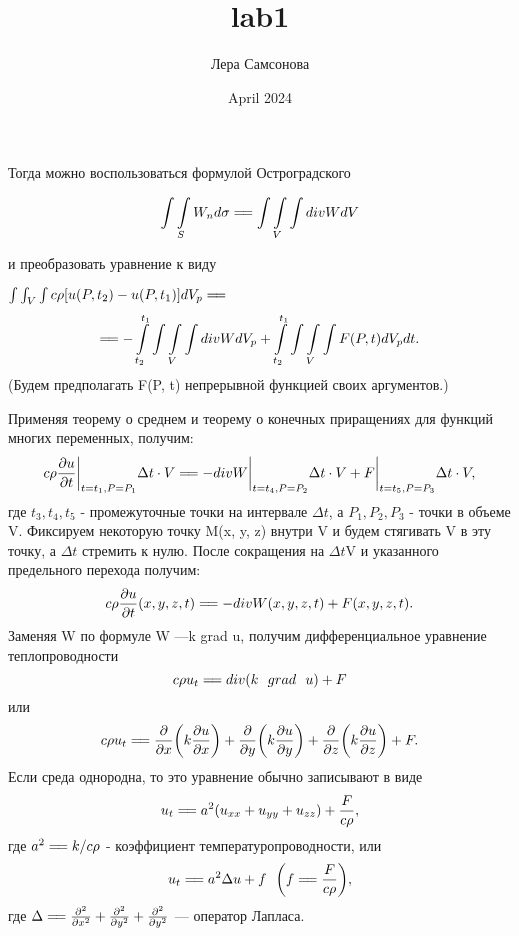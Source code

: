 \documentclass{article}
\title{lab1}
\author{Лера Самсонова}
\date{April 2024}
\begin{document}
\maketitle  
\begin{flushleft}
Тогда можно воспользоваться формулой Остроградского \newline

$$\int\int\limits_{S} W_n d\sigma =\joinrel= \int \int\limits_V \int div W dV$$

и преобразовать уравнение к виду\newline

$\int \int_V \int c\rho [u (P, t_2) - u (P, t_1)] dV_p =\joinrel= $
$$=\joinrel= - \int\limits_{t_2}^{t_1} \int \int\limits_V \int  div W dV_p + \int\limits_{t_2}^{t_1} \int \int\limits_V \int  F(P, t)dV_pdt.$$
(Будем предполагать F(P, t) непрерывной функцией своих аргументов.)

\parindent=0.5cm 
Применяя теорему о среднем и теорему о конечных приращениях для функций многих переменных, получим:\newline
$$c\rho\frac{\partial u}{\partial t}\bigg|_{\substack{t=t_1 , P=P_1}}  \Delta t \cdot V =\joinrel= - div W \bigg|_{\substack{t=t_4 , P=P_2}} \Delta t \cdot V + F\bigg|_{\substack{t=t_5 , P=P_3}} \Delta t \cdot V,$$
где $t_3, t_4, t_5$ - промежуточные точки на интервале $\Delta t$, а $P_1, P_2, P_3$ - точки в объеме V. Фиксируем некоторую точку M(x, y, z) внутри V и будем стягивать V в эту точку, а $\Delta t$ стремить к нулю. После сокращения на $\Delta t$V и указанного предельного перехода получим: 
$$c\rho\frac{\partial u}{\partial t}(x, y, z, t) =\joinrel= - div W (x, y, z, t) + F (x, y, z, t).$$
Заменяя W по формуле W ---k grad u, получим дифференциальное уравнение теплопроводности \newline
$$c\rho u_t =\joinrel=  div(k \ \ grad \ \ u) + F$$
или
$$c\rho u_t =\joinrel= \frac{\partial}{\partial x} \bigg(k \frac{\partial u}{\partial x}\bigg) + \frac{\partial}{\partial y} \bigg(k \frac{\partial u}{\partial y}\bigg) + \frac{\partial}{\partial z} \bigg(k \frac{\partial u}{\partial z}\bigg) + F.$$
Если среда однородна, то это уравнение обычно записывают в виде
$$u_t =\joinrel= a^2 (u_{xx} + u_{yy} + u_{zz}) + \frac{F}{c\rho},$$
где $a^2 =\joinrel= k/c\rho$ - коэффициент температуропроводности, или 
$$u_t =\joinrel= a^2 \Delta u + f \ \ \bigg(f =\joinrel= \frac{F}{c\rho}\bigg),$$
где $\Delta =\joinrel= \frac{\partial^2}{\partial x^2} + \frac{\partial^2}{\partial y^2} + \frac{\partial^2}{\partial y^2}$ --- оператор Лапласа.\newline
\\


\end{flushleft}
\end{document}
